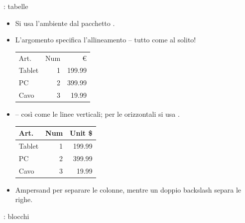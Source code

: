 \documentclass{beamer}
\begin{document}
\begin{frame}[fragile]{\insertsection: tabelle}
\begin{itemize}
\item Si usa l'ambiente  dal pacchetto .
\item L'argomento specifica l'allineamento -- tutto come al solito!
\begin{exampletwouptiny}
\begin{tabular}{lrr}
Art.   & Num & \euro \\
Tablet & 1   & 199.99  \\
PC     & 2   & 399.99  \\
Cavo   & 3   & 19.99   \\
\end{tabular}
\end{exampletwouptiny}
\item -- cos\`i come le linee verticali; per le orizzontali si usa .
\begin{exampletwouptiny}
\begin{tabular}{|l|r|r|} \hline
Art.   & Num & Unit \$ \\\hline
Tablet & 1   & 199.99  \\
PC     & 2   & 399.99  \\
Cavo   & 3   & 19.99   \\\hline
\end{tabular}
\end{exampletwouptiny}
\item Ampersand \keystrokebftt{\&} per separare le colonne, mentre un doppio backslash \keystrokebftt{\bs}\keystrokebftt{\bs} separa le righe.
\end{itemize}
\end{frame}

\begin{frame}[fragile]{\insertsection: blocchi}
\end{frame}
\end{document}
